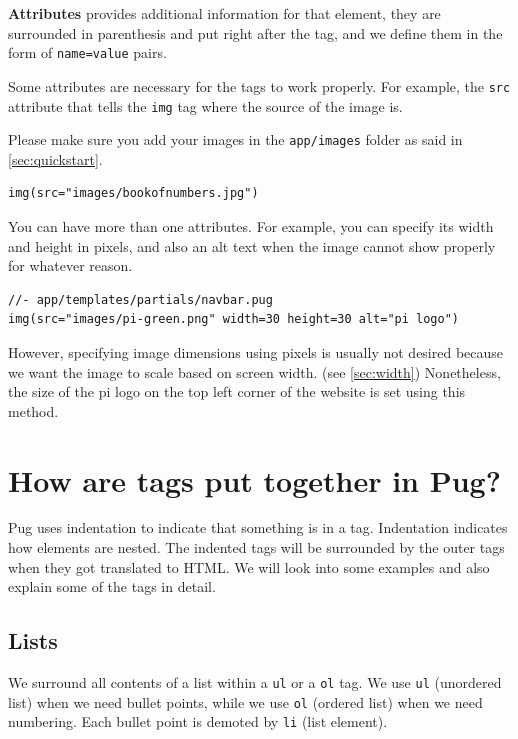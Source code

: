 \textbf{Attributes} provides additional information for that element, they are surrounded in parenthesis and put right after the tag, and we define them in the form of \texttt{name=value} pairs.

Some attributes are necessary for the tags to work properly. For example, the \texttt{src} attribute that tells the \texttt{img} tag where the source of the image is. 

Please make sure you add your images in the \texttt{app/images} folder as said in \cref{sec:quickstart}.
\vspace{6mm}

\begin{lstlisting}[language=pug]
img(src="images/bookofnumbers.jpg")
\end{lstlisting}

You can have more than one attributes. For example, you can specify its width and height in pixels, and also an alt text when the image cannot show properly for whatever reason.

\begin{lstlisting}[language=pug]
//- app/templates/partials/navbar.pug
img(src="images/pi-green.png" width=30 height=30 alt="pi logo")
\end{lstlisting}

However, specifying image dimensions using pixels is usually not desired because we want the image to scale based on screen width. (see \cref{sec:width}) Nonetheless, the size of the pi logo on the top left corner of the website is set using this method.

\section{How are tags put together in Pug?}

Pug uses indentation to indicate that something is in a tag. Indentation indicates how elements are nested. The indented tags will be surrounded by the outer tags when they got translated to HTML. We will look into some examples and also explain some of the tags in detail. 

\subsection*{Lists}
\label{sec:list}

We surround all contents of a list within a \texttt{ul} or a \texttt{ol} tag. We use \texttt{ul} (unordered list) when we need bullet points, while we use \texttt{ol} (ordered list) when we need numbering. Each bullet point is demoted by \texttt{li} (list element).

